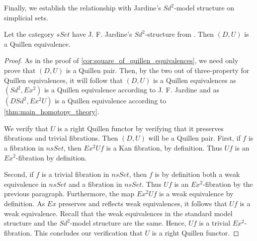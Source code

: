 \noindent Finally, we establish the relationship with Jardine's $Sd^2$-model structure on simplicial sets.
\begin{lemma}\label{cor:sd2_structure_d_u_Quillen}
Let the category $sSet$ have J. F. Jardine's $Sd^2$-structure from \cite[p.~274]{Ja13}. Then $(D,U)$ is a Quillen equivalence.
\end{lemma}
\begin{proof}
As in the proof of \cref{cor:square_of_quillen_equivalences}, we need only prove that $(D,U)$ is a Quillen pair. Then, by the two out of three-property for Quillen equivalences, it will follow that $(D,U)$ is a Quillen equivalences as $(Sd^2,Ex^2)$ is a Quillen equivalence according to J. F. Jardine \cite[Thm.~1.1.,~p.~274]{Ja13} and as $(DSd^2,Ex^2U)$ is a Quillen equivalence according to \cref{thm:main_homotopy_theory}.

We verify that $U$ is a right Quillen functor by verifying that it preserves fibrations and trivial fibrations. Then $(D,U)$ will be a Quillen pair. First, if $f$ is a fibration in $nsSet$, then $Ex^2Uf$ is a Kan fibration, by definition. Thus $Uf$ is an $Ex^2$-fibration by definition.

Second, if $f$ is a trivial fibration in $nsSet$, then $f$ is by definition both a weak equivalence in $nsSet$ and a fibration in $nsSet$. Thus $Uf$ is an $Ex^2$-fibration by the previous paragraph. Furthermore, the map $Ex^2Uf$ is a weak equivalence by definition. As $Ex$ preserves and reflects weak equivalences, it follows that $Uf$ is a weak equivalence. Recall that the weak equivalences in the standard model structure and the $Sd^2$-model structure are the same. Hence, $Uf$ is a trivial $Ex^2$-fibration. This concludes our verification that $U$ is a right Quillen functor.
\end{proof}

